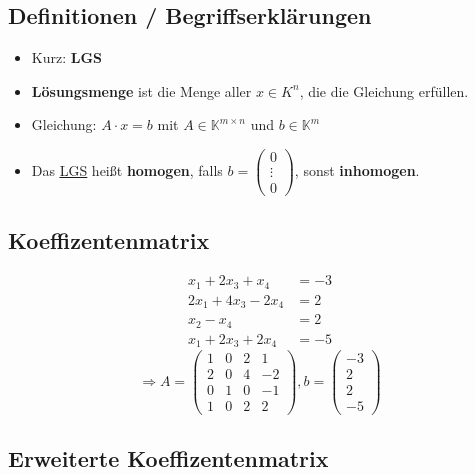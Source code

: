 \documentclass{scrartcl}
\newcommand{\linkTo}[1]{\hyperref[#1]{\underline{#1}}}
\begin{document}
\subsection{Definitionen / Begriffserklärungen}

\begin{itemize}
\item Kurz: \textbf{LGS}
\item \label{Lösungsmenge}\textbf{Lösungsmenge} ist die Menge aller $x \in K^n $, die die Gleichung erfüllen.
\item Gleichung: $A \cdot x = b$ mit $A \in \mathbb{K}^{m \times n}$ und $b \in \mathbb{K}^m$ 
\item Das \linkTo{LGS} heißt \label{homogenes LGS} \textbf{homogen}, falls $b = \begin{pmatrix} 0\\ \vdots \\ 0\end{pmatrix}$, sonst \label{inhomogens LGS} \textbf{inhomogen}.
\end{itemize}

\subsection{Koeffizentenmatrix}
\label{Koeffizentenmatrix} 

\begin{align*}
x_1 + 2x_3 + x_4 &= -3\\
2x_1 + 4x_3 - 2x_4 &= 2\\
x_2 -x_4 &= 2 \\
x_1 + 2x_3 + 2x_4 &= -5
\end{align*}
\[
\Rightarrow A = 
\begin{pmatrix}
1 & 0 & 2 & 1\\
2 & 0 & 4 & -2\\
0 & 1 & 0 & -1\\
1 & 0 & 2 & 2 
\end{pmatrix}, b = \begin{pmatrix}
-3 \\
2 \\
2\\
-5
\end{pmatrix}
\]

\subsection{Erweiterte Koeffizentenmatrix}
\label{erweiterete Koeffizentenmatrix} 
\end{document}
